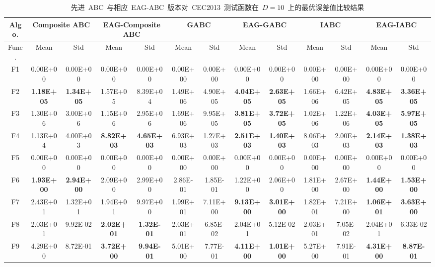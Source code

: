 \begin{table*}[!ht]
  \centering
  \caption{先进~ABC~与相应~EAG-ABC~版本对~CEC2013~测试函数在~$D=10$~上的最优误差值比较结果}
  \tiny
   \begin{tabular}{|c|cc|cc|cc|cc|cc|cc|}
    \hline
    Algo.   & \multicolumn{2}{c|}{Composite ABC} & \multicolumn{2}{c|}{EAG-Composite ABC} & \multicolumn{2}{c|}{GABC} & \multicolumn{2}{c|}{EAG-GABC} & \multicolumn{2}{c|}{ IABC } & \multicolumn{2}{c|}{EAG-IABC} \\
    \hline
    Func.   & Mean  & Std   & Mean  & Std   & Mean  & Std   & Mean  & Std   &  Mean  &  Std  & Mean  & Std \\
    \hline
    F1    & 0.00E+00 & 0.00E+00 & 0.00E+00 & 0.00E+00 & 0.00E+00 & 0.00E+00 & 0.00E+00 & 0.00E+00 & 0.00E+00 & 0.00E+00 & 0.00E+00 & 0.00E+00 \\
    F2    & \textbf{1.18E+05} & \textbf{1.34E+05} & 1.57E+05 & 8.39E+04 & 1.49E+06 & 4.90E+05 & \textbf{4.04E+05} & \textbf{2.63E+05} & 1.66E+06 & 6.42E+05 & \textbf{4.83E+05} & \textbf{3.36E+05} \\
    F3    & 1.30E+06 & 3.00E+06 & 1.15E+06 & 2.95E+06 & 1.69E+06 & 9.95E+05 & \textbf{3.81E+05} & \textbf{3.72E+05} & 1.02E+06 & 1.22E+06 & \textbf{4.03E+05} & \textbf{5.97E+05} \\
    F4    & 1.13E+04 & 4.00E+03 & \textbf{8.82E+03} & \textbf{4.65E+03} & 6.93E+03 & 1.27E+03 & \textbf{2.51E+03} & \textbf{1.40E+03} & 8.06E+03 & 2.00E+03 & \textbf{2.14E+03} & \textbf{1.38E+03} \\
    F5    & 0.00E+00 & 0.00E+00 & 0.00E+00 & 0.00E+00 & 0.00E+00 & 0.00E+00 & 0.00E+00 & 0.00E+00 & 0.00E+00 & 0.00E+00 & 0.00E+00 & 0.00E+00 \\
    \hline
    F6    & \textbf{1.93E+00} & \textbf{2.94E+00} & 2.09E+00 & 2.99E+00 & 2.86E-01 & 1.85E-01 & 1.22E+00 & 2.06E+00 & 1.81E+00 & 2.67E+00 & \textbf{1.44E+00} & \textbf{1.53E+00} \\
    F7    & 2.43E+01 & 1.32E+01 & 1.94E+01 & 9.97E+00 & 1.99E+01 & 7.11E+00 & \textbf{9.13E+00} & \textbf{3.01E+00} & 1.82E+01 & 7.21E+00 & \textbf{1.06E+01} & \textbf{3.63E+00} \\
    F8    & 2.03E+01 & 9.92E-02 & \textbf{2.02E+01} & \textbf{1.32E-01} & 2.03E+01 & 6.85E-02 & 2.04E+01 & 5.12E-02 & 2.03E+01 & 7.05E-02 & 2.04E+01 & 6.33E-02 \\
    F9    & 4.29E+00 & 8.72E-01 & \textbf{3.72E+00} & \textbf{9.94E-01} & 5.01E+00 & 7.77E-01 & \textbf{4.11E+00} & \textbf{1.01E+00} & 5.27E+00 & 7.91E-01 & \textbf{4.31E+00} & \textbf{8.87E-01} \\

\end{tabular}
\end{table*}
